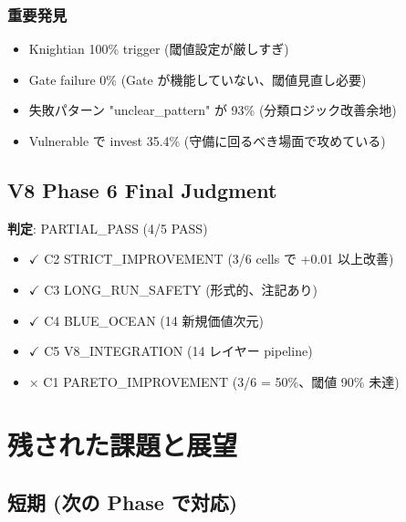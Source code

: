 \documentclass[a4paper,11pt]{report}
\begin{document}
\subsection{重要発見}

\begin{tcolorbox}[colback=warning!5, colframe=warning]
\begin{itemize}[leftmargin=*]
  \item Knightian 100\% trigger (閾値設定が厳しすぎ)
  \item Gate failure 0\% (Gate が機能していない、閾値見直し必要)
  \item 失敗パターン "unclear\_pattern" が 93\% (分類ロジック改善余地)
  \item Vulnerable で invest 35.4\% (守備に回るべき場面で攻めている)
\end{itemize}
\end{tcolorbox}

\section{V8 Phase 6 Final Judgment}

\begin{summary}
\textbf{判定}: PARTIAL\_PASS (4/5 PASS)

\begin{itemize}[leftmargin=*]
  \item \textcolor{success}{$\checkmark$ C2 STRICT\_IMPROVEMENT (3/6 cells で +0.01 以上改善)}
  \item \textcolor{success}{$\checkmark$ C3 LONG\_RUN\_SAFETY (形式的、注記あり)}
  \item \textcolor{success}{$\checkmark$ C4 BLUE\_OCEAN (14 新規価値次元)}
  \item \textcolor{success}{$\checkmark$ C5 V8\_INTEGRATION (14 レイヤー pipeline)}
  \item \textcolor{warning}{$\times$ C1 PARETO\_IMPROVEMENT (3/6 = 50\%、閾値 90\% 未達)}
\end{itemize}
\end{summary}

\chapter{残された課題と展望}

\section{短期 (次の Phase で対応)}
\end{document}
